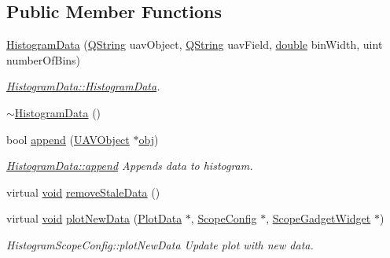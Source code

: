 \subsection*{Public Member Functions}
\begin{DoxyCompactItemize}
\item 
\hyperlink{group___scope_plugin_ga72e50dd5614c61d39ec10aa120c47d3b}{Histogram\-Data} (\hyperlink{group___u_a_v_objects_plugin_gab9d252f49c333c94a72f97ce3105a32d}{Q\-String} uav\-Object, \hyperlink{group___u_a_v_objects_plugin_gab9d252f49c333c94a72f97ce3105a32d}{Q\-String} uav\-Field, \hyperlink{_super_l_u_support_8h_a8956b2b9f49bf918deed98379d159ca7}{double} bin\-Width, uint number\-Of\-Bins)
\begin{DoxyCompactList}\small\item\em \hyperlink{group___scope_plugin_ga72e50dd5614c61d39ec10aa120c47d3b}{Histogram\-Data\-::\-Histogram\-Data}. \end{DoxyCompactList}\item 
\hyperlink{group___scope_plugin_ga4469655db4ea251dc664d6537ac56c5a}{$\sim$\-Histogram\-Data} ()
\item 
bool \hyperlink{group___scope_plugin_ga0d810ba48c487ee265cdc1386b23bece}{append} (\hyperlink{class_u_a_v_object}{U\-A\-V\-Object} $\ast$\hyperlink{glext_8h_a0c0d4701a6c89f4f7f0640715d27ab26}{obj})
\begin{DoxyCompactList}\small\item\em \hyperlink{group___scope_plugin_ga0d810ba48c487ee265cdc1386b23bece}{Histogram\-Data\-::append} Appends data to histogram. \end{DoxyCompactList}\item 
virtual \hyperlink{group___u_a_v_objects_plugin_ga444cf2ff3f0ecbe028adce838d373f5c}{void} \hyperlink{group___scope_plugin_ga347aa15de12fde18bb0b88245ef0ff57}{remove\-Stale\-Data} ()
\item 
virtual \hyperlink{group___u_a_v_objects_plugin_ga444cf2ff3f0ecbe028adce838d373f5c}{void} \hyperlink{group___scope_plugin_gac17c425a9e59f0b1187d76a8cc13e6ad}{plot\-New\-Data} (\hyperlink{class_plot_data}{Plot\-Data} $\ast$, \hyperlink{class_scope_config}{Scope\-Config} $\ast$, \hyperlink{class_scope_gadget_widget}{Scope\-Gadget\-Widget} $\ast$)
\begin{DoxyCompactList}\small\item\em Histogram\-Scope\-Config\-::plot\-New\-Data Update plot with new data. \end{DoxyCompactList}\item 

\end{DoxyCompactItemize}
